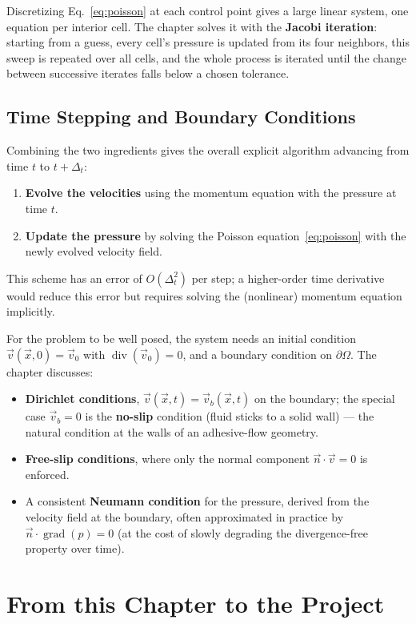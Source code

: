 \documentclass[11pt]{article}
\newcommand{\vv}{\vec{v}}
\newcommand{\vx}{\vec{x}}
\begin{document}
Discretizing Eq.~\eqref{eq:poisson} at each control point gives a large linear system, one equation per interior cell. The chapter solves it with the \textbf{Jacobi iteration}: starting from a guess, every cell's pressure is updated from its four neighbors, this sweep is repeated over all cells, and the whole process is iterated until the change between successive iterates falls below a chosen tolerance.

\subsection{Time Stepping and Boundary Conditions}

Combining the two ingredients gives the overall explicit algorithm advancing from time $t$ to $t+\Delta_t$:
\begin{enumerate}[label=\arabic*.]
  \item \textbf{Evolve the velocities} using the momentum equation with the pressure at time $t$.
  \item \textbf{Update the pressure} by solving the Poisson equation~\eqref{eq:poisson} with the newly evolved velocity field.
\end{enumerate}
This scheme has an error of $O(\Delta_t^2)$ per step; a higher-order time derivative would reduce this error but requires solving the (nonlinear) momentum equation implicitly.

For the problem to be well posed, the system needs an initial condition $\vv(\vx,0)=\vv_0$ with $\operatorname{div}(\vv_0)=0$, and a boundary condition on $\partial\Omega$. The chapter discusses:
\begin{itemize}
  \item \textbf{Dirichlet conditions}, $\vv(\vx,t) = \vv_b(\vx,t)$ on the boundary; the special case $\vv_b = 0$ is the \textbf{no-slip} condition (fluid sticks to a solid wall) — the natural condition at the walls of an adhesive-flow geometry.
  \item \textbf{Free-slip conditions}, where only the normal component $\vec n\cdot\vv = 0$ is enforced.
  \item A consistent \textbf{Neumann condition} for the pressure, derived from the velocity field at the boundary, often approximated in practice by $\vec n\cdot\operatorname{grad}(p) = 0$ (at the cost of slowly degrading the divergence-free property over time).
\end{itemize}

\section*{From this Chapter to the Project}
\end{document}

